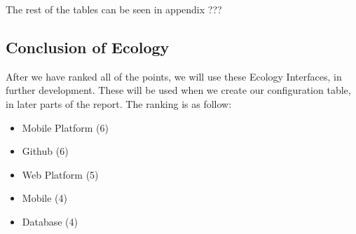 The rest of the tables can be seen in appendix ???

\subsection{Conclusion of Ecology}
After we have ranked all of the points, we will use these Ecology Interfaces, in further development.
These will be used when we create our configuration table, in later parts of the report.
The ranking is as follow:

\begin{itemize}
    \item Mobile Platform (6)
    \item Github (6)
    \item Web Platform (5)
    \item Mobile (4)
    \item Database (4)
\end{itemize}